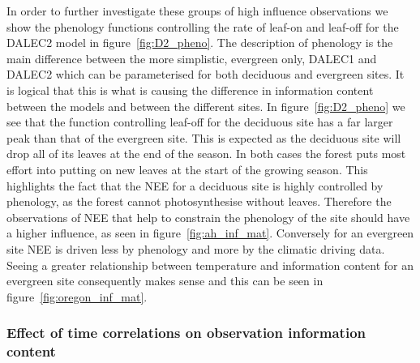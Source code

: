 \documentclass[11pt]{article}
\begin{document}
In order to further investigate these groups of high influence observations we show the phenology functions controlling the rate of leaf-on and leaf-off for the DALEC2 model in figure~\ref{fig:D2_pheno}. The description of phenology is the main difference between the more simplistic, evergreen only, DALEC1 and DALEC2 which can be parameterised for both deciduous and evergreen sites. It is logical that this is what is causing the difference in information content between the models and between the different sites. In figure~\ref{fig:D2_pheno} we see that the function controlling leaf-off for the deciduous site has a far larger peak than that of the evergreen site. This is expected as the deciduous site will drop all of its leaves at the end of the season. In both cases the forest puts most effort into putting on new leaves at the start of the growing season. This highlights the fact that the NEE for a deciduous site is highly controlled by phenology, as the forest cannot photosynthesise without leaves. Therefore the observations of NEE that help to constrain the phenology of the site should have a higher influence, as seen in figure~\ref{fig:ah_inf_mat}. Conversely for an evergreen site NEE is driven less by phenology and more by the climatic driving data. Seeing a greater relationship between temperature and information content  for an evergreen site consequently makes sense and this can be seen in figure~\ref{fig:oregon_inf_mat}.



\subsubsection{Effect of time correlations on observation information content}
\end{document}
